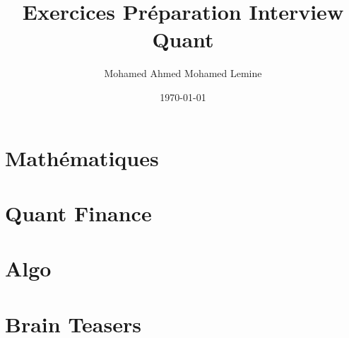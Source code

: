 \documentclass[a4paper,11pt]{book}
\begin{document}

\title{\textbf{Exercices Préparation Interview Quant}}
\author{Mohamed Ahmed Mohamed Lemine}
\date{\today}
\maketitle


\tableofcontents
\clearpage



\part{Mathématiques}




\part{Quant Finance}



\part{Algo}


\part{Brain Teasers}

\end{document}
